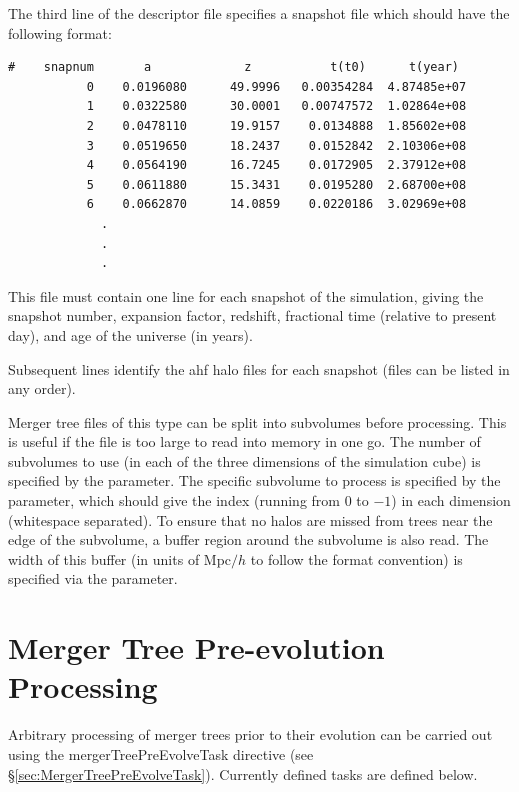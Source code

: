 The third line of the descriptor file specifies a snapshot file which should have the following format:
\begin{verbatim}
#    snapnum       a             z           t(t0)      t(year)
           0    0.0196080      49.9996   0.00354284  4.87485e+07
           1    0.0322580      30.0001   0.00747572  1.02864e+08
           2    0.0478110      19.9157    0.0134888  1.85602e+08
           3    0.0519650      18.2437    0.0152842  2.10306e+08
           4    0.0564190      16.7245    0.0172905  2.37912e+08
           5    0.0611880      15.3431    0.0195280  2.68700e+08
           6    0.0662870      14.0859    0.0220186  3.02969e+08
             .
             .
             .
\end{verbatim}
This file must contain one line for each snapshot of the simulation, giving the snapshot number, expansion factor, redshift, fractional time (relative to present day), and age of the universe (in years).

Subsequent lines identify the \gls{ahf} halo files for each snapshot (files can be listed in any order).

Merger tree files of this type can be split into subvolumes before processing. This is useful if the file is too large to read into memory in one go. The number of subvolumes to use (in each of the three dimensions of the simulation cube) is specified by the {\normalfont \ttfamily [mergerTreeImportSussingSubvolumeCount]} parameter. The specific subvolume to process is specified by the {\normalfont \ttfamily [mergerTreeImportSussingSubvolumeIndex]} parameter, which should give the index (running from $0$ to {\normalfont \ttfamily [mergerTreeImportSussingSubvolumeCount]}$-1$) in each dimension (whitespace separated). To ensure that no halos are missed from trees near the edge of the subvolume, a buffer region around the subvolume is also read. The width of this buffer (in units of Mpc$/h$ to follow the format convention) is specified via the {\normalfont \ttfamily [mergerTreeImportSussingSubvolumeBuffer]} parameter. 

\section{Merger Tree Pre-evolution Processing}

Arbitrary processing of merger trees prior to their evolution can be carried out using the {\normalfont \ttfamily mergerTreePreEvolveTask} directive (see \S\ref{sec:MergerTreePreEvolveTask}). Currently defined tasks are defined below.

